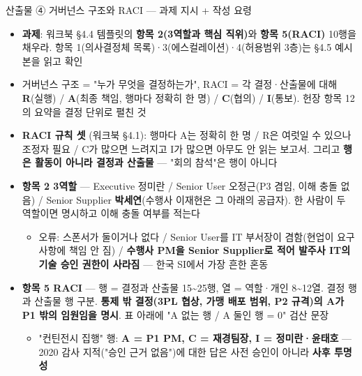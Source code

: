 \begin{frame}[allowframebreaks=1.0]{산출물 ④ 거버넌스 구조와 RACI — 과제 지시 + 작성 요령}
\small
\begin{itemize}
\item\relax \textbf{과제}: 워크북 §4.4 템플릿의 \textbf{항목 2(3역할과 핵심 직위)}와 \textbf{항목 5(RACI)} 10행을 채우라. 항목 1(의사결정체 목록)·3(에스컬레이션)·4(허용범위 3층)는 §4.5 예시본을 읽고 확인
\item\relax 거버넌스 구조 = "누가 무엇을 결정하는가", RACI = 각 결정·산출물에 대해 \textbf{R}(실행) / \textbf{A}(최종 책임, 행마다 정확히 한 명) / \textbf{C}(협의) / \textbf{I}(통보). 헌장 항목 12의 요약을 결정 단위로 펼친 것
\item\relax \textbf{RACI 규칙 셋} (워크북 §4.1): 행마다 A는 정확히 한 명 / R은 여럿일 수 있으나 조정자 필요 / C가 많으면 느려지고 I가 많으면 아무도 안 읽는 보고서. 그리고 \textbf{행은 활동이 아니라 결정과 산출물} — "회의 참석"은 행이 아니다
\item\relax \textbf{항목 2 3역할} — Executive 정미란 / Senior User 오정근(P3 겸임, 이해 충돌 없음) / Senior Supplier \textbf{박세연}(수행사 이재현은 그 아래의 공급자). 한 사람이 두 역할이면 명시하고 이해 충돌 여부를 적는다
\par\nobreak
\begin{itemize}
\item\relax 오류: 스폰서가 둘이거나 없다 / Senior User를 IT 부서장이 겸함(현업이 요구사항에 책임 안 짐) / \textbf{수행사 PM을 Senior Supplier로 적어 발주사 IT의 기술 승인 권한이 사라짐} — 한국 SI에서 가장 흔한 혼동
\end{itemize}
\item\relax \textbf{항목 5 RACI} — 행 = 결정과 산출물 15\textasciitilde{}25행, 열 = 역할·개인 8\textasciitilde{}12열. 결정 행과 산출물 행 구분. \textbf{통제 밖 결정(3PL 협상, 가맹 배포 범위, P2 규격)의 A가 P1 밖의 임원임을 명시}. 표 아래에 "A 없는 행 / A 둘인 행 = 0" 검산 문장
\par\nobreak
\begin{itemize}
\item\relax "컨틴전시 집행" 행: \textbf{A = P1 PM, C = 재경팀장, I = 정미란·윤태호} — 2020 감사 지적("승인 근거 없음")에 대한 답은 사전 승인이 아니라 \textbf{사후 투명성}
\end{itemize}
\end{itemize}
\end{frame}

